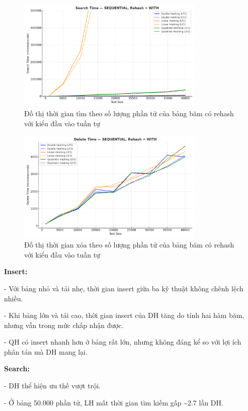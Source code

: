 \documentclass[12pt,a4paper]{report}
\begin{document}
\begin{figure}[!ht]
    \centering
    \includegraphics[width=0.8\textwidth]{seq_sear_hash.png}
    \caption{Đồ thị thời gian tìm theo số lượng phần tử của bảng băm có rehash với kiểu đầu vào tuần tự}
    \label{fig:flowchart}
\end{figure}

\begin{figure}[!ht]
    \centering
    \includegraphics[width=0.8\textwidth]{seq_del_hash.png}
    \caption{Đồ thị thời gian xóa theo số lượng phần tử của bảng băm có rehash với kiểu đầu vào tuần tự}
    \label{fig:flowchart}
\end{figure}
\noindent \indent \textbf{Insert:}

-	Với bảng nhỏ và tải nhẹ, thời gian insert giữa ba kỹ thuật không chênh lệch nhiều.

-	Khi bảng lớn và tải cao, thời gian insert của DH tăng do tính hai hàm băm, nhưng vẫn trong mức chấp nhận được.

-	QH có insert nhanh hơn ở bảng rất lớn, nhưng không đáng kể so với lợi ích phân tán mà DH mang lại.

 \textbf{Search:}
 
-	DH thể hiện ưu thế vượt trội.

-	Ở bảng 50.000 phần tử, LH mất thời gian tìm kiếm gấp \textasciitilde 2.7 lần DH.
\end{document}

